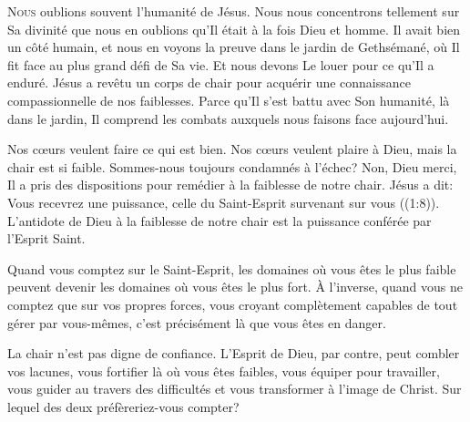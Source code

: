 \dvrule







\lettrine{N}{ous} oublions souvent l'humanité de Jésus.
 Nous nous concentrons tellement sur Sa divinité que nous en oublions
 qu'Il était à la fois Dieu et homme. Il avait bien un côté humain,
 et nous en voyons la preuve dans le jardin de Gethsémané, 
 où Il fit face au plus grand défi de Sa vie.
 Et nous devons Le  louer pour ce qu'Il a enduré.
 Jésus a revêtu un corps de chair pour acquérir une connaissance
 compassionnelle de nos faiblesses. Parce qu'Il s'est battu avec Son humanité,
 là dans le jardin, Il comprend les combats auxquels nous faisons
 face aujourd'hui.

Nos c\oe{}urs veulent faire ce qui est bien.
 Nos c\oe{}urs veulent plaire à Dieu, mais la chair est si faible.
 Sommes-nous toujours condamnés à l'échec? Non, Dieu merci,
 Il a pris des dispositions pour remédier à la faiblesse de notre chair.
 Jésus a dit: 
 \Og Vous recevrez une puissance, celle du Saint-Esprit survenant sur vous \Fg{}
 ((1:8)).
 L'antidote de Dieu à la faiblesse de notre chair
 est la puissance conférée par l'Esprit Saint.


Quand vous comptez sur le Saint-Esprit, les domaines où vous êtes
 le plus faible peuvent devenir les domaines où vous êtes le plus fort.
 À l'inverse, quand vous ne comptez que sur vos propres forces,
 vous croyant complètement capables de tout gérer par vous-mêmes,
 c'est précisément là que vous êtes en danger.

La chair n'est pas digne de confiance.
 L'Esprit de Dieu, par contre, peut combler vos lacunes,
 vous fortifier là où vous êtes faibles, vous équiper pour travailler,
 vous guider au travers des difficultés et vous transformer
 à l'image de Christ. Sur lequel des deux préfèreriez-vous compter?


